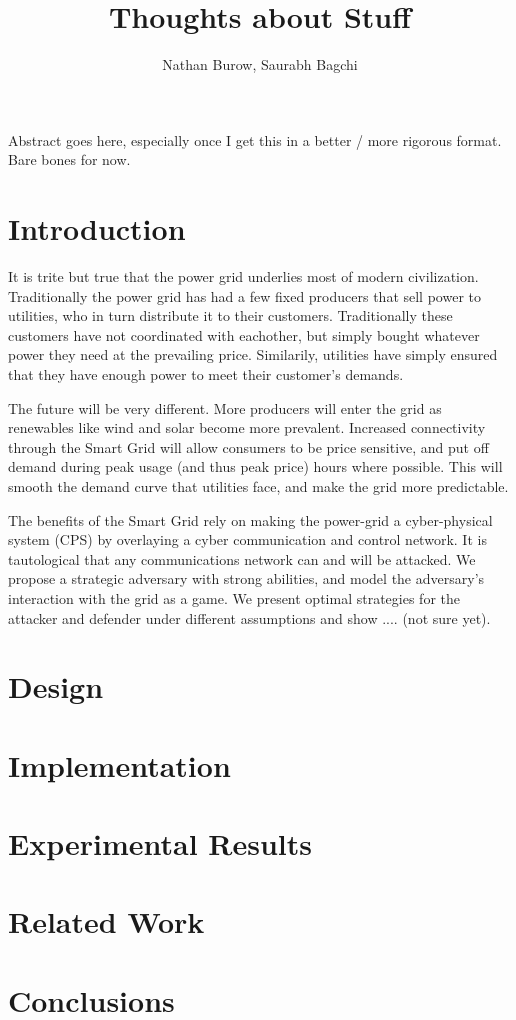 \documentclass{article}
\begin{document}
\title{Thoughts about Stuff}

\author{Nathan Burow, Saurabh Bagchi}

\maketitle
\begin{multicols}{2}

Abstract goes here, especially once I get this in a better / more rigorous format.  Bare bones for now.

\section{Introduction}

It is trite but true that the power grid underlies most of modern civilization.  Traditionally the power grid has had a 
few fixed producers that sell power to utilities, who in turn distribute it to their customers.  Traditionally these 
customers have not coordinated with eachother, but simply bought whatever power they need at the prevailing price.  
Similarily, utilities have simply ensured that they have enough power to meet their customer's demands.  

The future will be very different.  More producers will enter the grid as renewables like wind and solar become more
prevalent.  Increased connectivity through the Smart Grid will allow consumers to be price sensitive, and put off 
demand during peak usage (and thus peak price) hours where possible.  This will smooth the demand curve that utilities face,
and make the grid more predictable.

The benefits of the Smart Grid rely on making the power-grid a cyber-physical system (CPS) by overlaying a cyber 
communication and control network.  It is tautological that any communications network can and will be attacked.  
We propose a strategic adversary with strong abilities, and model the adversary's interaction with the grid as a game.
We present optimal strategies for the attacker and defender under different assumptions and show .... (not sure yet).

\section{Design}
\section{Implementation}
\section{Experimental Results}
\section{Related Work}
\section{Conclusions}
\end{multicols}
\end{document}
